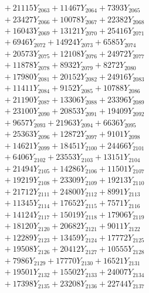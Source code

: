 \documentclass[a4paper,10pt]{article}
\begin{document}
{\begin{align}
&\;  + 21115 Y_{2063} + 11467 Y_{2064} + 7393 Y_{2065} \\[0.3ex]
&\;  + 23427 Y_{2066} + 10078 Y_{2067} + 22382 Y_{2068} \\[0.5ex]\allowbreak
&\;  + 16043 Y_{2069} + 13121 Y_{2070} + 25416 Y_{2071} \\[0.3ex]
&\;  + 6946 Y_{2072} + 14924 Y_{2073} + 6585 Y_{2074} \\[0.3ex]
&\;  + 20573 Y_{2075} + 12108 Y_{2076} + 24972 Y_{2077} \\[0.3ex]
&\;  + 11878 Y_{2078} + 8932 Y_{2079} + 8272 Y_{2080} \\[0.3ex]
&\;  + 17980 Y_{2081} + 20152 Y_{2082} + 24916 Y_{2083} \\[0.3ex]
&\;  + 11411 Y_{2084} + 9152 Y_{2085} + 10788 Y_{2086} \\[0.3ex]
&\;  + 21190 Y_{2087} + 13306 Y_{2088} + 23396 Y_{2089} \\[0.3ex]
&\;  + 23100 Y_{2090} + 20853 Y_{2091} + 19409 Y_{2092} \\[0.3ex]
&\;  + 9657 Y_{2093} + 21963 Y_{2094} + 6636 Y_{2095} \\[0.3ex]
&\;  + 25363 Y_{2096} + 12872 Y_{2097} + 9101 Y_{2098} \\[0.5ex]\allowbreak
&\;  + 14621 Y_{2099} + 18451 Y_{2100} + 24466 Y_{2101} \\[0.3ex]
&\;  + 6406 Y_{2102} + 23553 Y_{2103} + 13151 Y_{2104} \\[0.3ex]
&\;  + 21494 Y_{2105} + 14286 Y_{2106} + 11501 Y_{2107} \\[0.3ex]
&\;  + 19219 Y_{2108} + 23309 Y_{2109} + 19213 Y_{2110} \\[0.3ex]
&\;  + 21712 Y_{2111} + 24800 Y_{2112} + 8991 Y_{2113} \\[0.3ex]
&\;  + 11345 Y_{2114} + 17652 Y_{2115} + 7571 Y_{2116} \\[0.3ex]
&\;  + 14124 Y_{2117} + 15019 Y_{2118} + 17906 Y_{2119} \\[0.3ex]
&\;  + 18120 Y_{2120} + 20682 Y_{2121} + 9011 Y_{2122} \\[0.3ex]
&\;  + 12289 Y_{2123} + 13459 Y_{2124} + 17772 Y_{2125} \\[0.3ex]
&\;  + 19508 Y_{2126} + 20412 Y_{2127} + 10555 Y_{2128} \\[0.5ex]\allowbreak
&\;  + 7986 Y_{2129} + 17770 Y_{2130} + 16521 Y_{2131} \\[0.3ex]
&\;  + 19501 Y_{2132} + 15502 Y_{2133} + 24007 Y_{2134} \\[0.3ex]
&\;  + 17398 Y_{2135} + 23208 Y_{2136} + 22744 Y_{2137} \\[0.3ex]

\end{align}}
\end{document}
